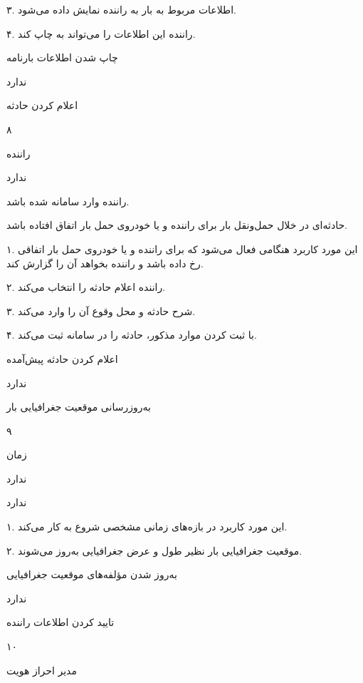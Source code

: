 ۳. اطلاعات مربوط به بار به راننده نمایش داده می‌شود.

۴. راننده این اطلاعات را می‌تواند به چاپ کند.

چاپ شدن اطلاعات بارنامه

ندارد

\newpage

اعلام کردن حادثه

۸

راننده

ندارد


راننده وارد سامانه شده باشد.

حادثه‌ای در خلال حمل‌و‌نقل بار برای راننده و یا خودروی حمل‌ بار اتفاق افتاده باشد.


۱. این مورد کاربرد هنگامی فعال می‌شود که برای راننده و یا خودروی حمل بار اتفاقی رخ داده باشد و  راننده بخواهد آن را گزارش کند.

۲. راننده اعلام حادثه را انتخاب می‌کند.

۳. شرح حادثه و محل وقوع آن را وارد می‌کند.

۴. با ثبت کردن موارد مذکور، حادثه را در سامانه ثبت می‌کند.

اعلام کردن حادثه پیش‌آمده

ندارد

\newpage

به‌روزرسانی موقعیت جغرافیایی بار

۹

زمان

ندارد

ندارد


۱. این مورد کاربرد در بازه‌های زمانی مشخصی شروع به کار می‌کند.

۲. موقعیت جغرافیایی بار نظیر طول و عرض جغرافیایی به‌روز می‌شوند.

به‌روز شدن مؤلفه‌های موقعیت جغرافیایی	

ندارد

\newpage

تایید کردن اطلاعات راننده

۱۰

مدیر احراز هویت

